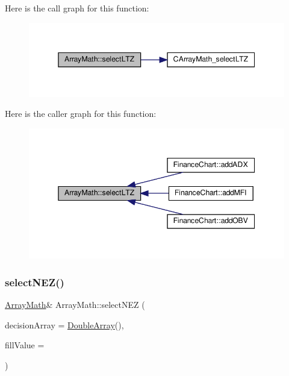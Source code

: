Here is the call graph for this function\+:
\nopagebreak
\begin{figure}[H]
\begin{center}
\leavevmode
\includegraphics[width=345pt]{class_array_math_ae10389934cacf3913e69b71c79fe5ae9_cgraph}
\end{center}
\end{figure}
Here is the caller graph for this function\+:
\nopagebreak
\begin{figure}[H]
\begin{center}
\leavevmode
\includegraphics[width=345pt]{class_array_math_ae10389934cacf3913e69b71c79fe5ae9_icgraph}
\end{center}
\end{figure}
\mbox{\label{class_array_math_a0ec9ff9be8d0f829ba79bd1a53a791a5}} 
\subsubsection{\texorpdfstring{select\+N\+E\+Z()}{selectNEZ()}}
{\footnotesize\ttfamily \hyperlink{class_array_math}{Array\+Math}\& Array\+Math\+::select\+N\+EZ (\begin{DoxyParamCaption}\item[{\hyperlink{class_double_array}{Double\+Array}}]{decision\+Array = {\ttfamily \hyperlink{class_double_array}{Double\+Array}()},  }\item[{double}]{fill\+Value = {} }\end{DoxyParamCaption})\hspace{0.3cm}{\ttfamily [inline]}}



